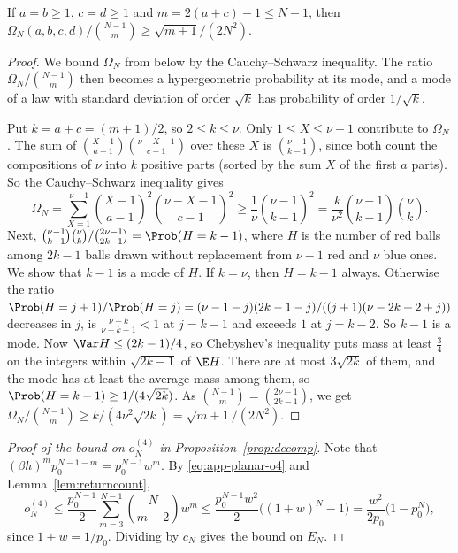 \begin{lemma}\label{lem:balanced}
If $a=b\ge1$, $c=d\ge1$ and $m=2(a+c)-1\le N-1$, then
$\Omega_N(a,b,c,d)/\binom{N-1}m\ge\sqrt{m+1}/(2N^2)$.
\end{lemma}

\begin{proof}
We bound $\Omega_N$ from below by the Cauchy--Schwarz inequality. The ratio
$\Omega_N/\binom{N-1}m$ then becomes a hypergeometric probability at its mode, and a mode of a law
with standard deviation of order $\sqrt k$ has probability of order $1/\sqrt k$.

Put $k=a+c=(m+1)/2$, so $2\le k\le\nu$. Only $1\le X\le\nu-1$ contribute to $\Omega_N$. The sum of
$\binom{X-1}{a-1}\binom{\nu-X-1}{c-1}$ over these $X$ is $\binom{\nu-1}{k-1}$, since both count the
compositions of $\nu$ into $k$ positive parts (sorted by the sum $X$ of the first $a$ parts). So the
Cauchy--Schwarz inequality gives
\[
 \Omega_N=\sum_{X=1}^{\nu-1}\binom{X-1}{a-1}^2\binom{\nu-X-1}{c-1}^2
 \ge\frac1\nu\binom{\nu-1}{k-1}^2=\frac k{\nu^2}\binom{\nu-1}{k-1}\binom\nu k .
\]
Next, $\binom{\nu-1}{k-1}\binom\nu k/\binom{2\nu-1}{2k-1}=\Prob(H=k-1)$, where $H$ is the number of
red balls among $2k-1$ balls drawn without replacement from $\nu-1$ red and $\nu$ blue ones. We show
that $k-1$ is a mode of $H$. If $k=\nu$, then $H=k-1$ always. Otherwise the ratio
$\Prob(H=j+1)/\Prob(H=j)=(\nu-1-j)(2k-1-j)/((j+1)(\nu-2k+2+j))$ decreases in $j$, is $\frac{\nu-k}{\nu-k+1}<1$ at $j=k-1$ and exceeds $1$ at $j=k-2$. So $k-1$ is a
mode. Now $\Var H\le(2k-1)/4$, so Chebyshev's inequality puts mass at least $\frac34$ on the
integers within $\sqrt{2k-1}$ of $\E H$. There are at most $3\sqrt{2k}$ of them, and the mode has
at least the average mass among them, so $\Prob(H=k-1)\ge1/(4\sqrt{2k})$. As
$\binom{N-1}m=\binom{2\nu-1}{2k-1}$, we get
$\Omega_N/\binom{N-1}m\ge k/(4\nu^2\sqrt{2k})=\sqrt{m+1}/(2N^2)$.
\end{proof}

\begin{proof}[Proof of the bound on $o^{(4)}_N$ in Proposition~\ref{prop:decomp}]
Note that $(\beta h)^mp_0^{N-1-m}=p_0^{N-1}w^m$. By \eqref{eq:app-planar-o4} and
Lemma~\ref{lem:returncount},
\[
 o^{(4)}_N\le\frac{p_0^{N-1}}2\sum_{m=3}^{N-1}\binom N{m-2}w^m
 \le\frac{p_0^{N-1}w^2}2\bigl((1+w)^N-1\bigr)=\frac{w^2}{2p_0}\bigl(1-p_0^N\bigr),
\]
since $1+w=1/p_0$. Dividing by $c_N$ gives the bound on $E_N$.
\end{proof}


